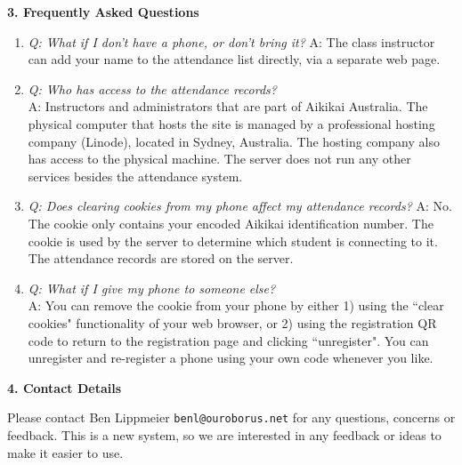 \begin{minipage}[t]{\dimexpr0.5\linewidth-1em}
\smallskip
\textbf{3. Frequently Asked Questions}
\begin{enumerate}
\item \emph{Q: What if I don't have a phone, or don't bring it?}
      A: The class instructor can add your name to the attendance list
         directly, via a separate web page.

\item \emph{Q: Who has access to the attendance records?} \\
      A: Instructors and administrators that are part of Aikikai Australia.
         The physical computer that hosts the site is managed by a professional
         hosting company (Linode), located in Sydney, Australia. The hosting company
         also has access to the physical machine. The server does not run any other
         services besides the attendance system.

\item \emph{Q: Does clearing cookies from my phone affect my attendance records?}
      A: No. The cookie only contains your encoded Aikikai identification number.
         The cookie is used by the server to determine which student
         is connecting to it. The attendance records are stored on the server.

\item \emph{Q: What if I give my phone to someone else?} \\
      A: You can remove the cookie from your phone by either 1) using the ``clear cookies"
         functionality of your web browser, or 2) using the registration QR code to return
         to the registration page and clicking ``unregister". You can unregister
         and re-register a phone using your own code whenever you like.
\end{enumerate}


\medskip
\textbf{4. Contact Details}

Please contact Ben Lippmeier \texttt{benl@ouroborus.net} for
any questions, concerns or feedback.
This is a new system, so we are interested in any feedback or ideas to make
it easier to use.
\end{minipage}
